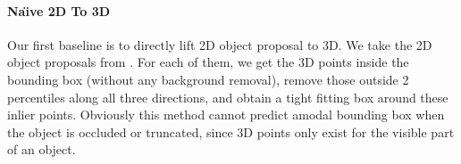 \documentclass[10pt,twocolumn,letterpaper]{article}
\begin{document}
\vspace{-4mm}\paragraph{Na\"{\i}ve 2D To 3D}
Our first baseline is to directly lift 2D object proposal to 3D.
We take the 2D object proposals from \cite{guptaCVPR15}.
For each of them, we get the 3D points inside the bounding box (without any background removal), remove those outside 2 percentiles along all three directions, and obtain a tight fitting box around these inlier points. 
Obviously this method cannot predict amodal bounding box when the object is occluded or truncated, 
since 3D points only exist for the visible part of an object.
\end{document}

